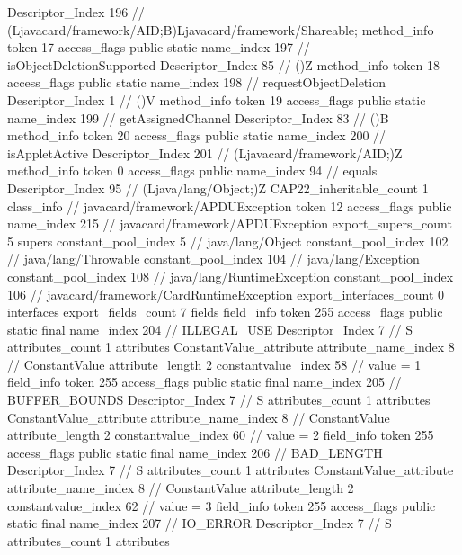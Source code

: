 {{{{{					Descriptor_Index	196		// (Ljavacard/framework/AID;B)Ljavacard/framework/Shareable;
				}
				method_info {
					token	17
					access_flags	public static
					name_index	197		// isObjectDeletionSupported
					Descriptor_Index	85		// ()Z
				}
				method_info {
					token	18
					access_flags	public static
					name_index	198		// requestObjectDeletion
					Descriptor_Index	1		// ()V
				}
				method_info {
					token	19
					access_flags	public static
					name_index	199		// getAssignedChannel
					Descriptor_Index	83		// ()B
				}
				method_info {
					token	20
					access_flags	public static
					name_index	200		// isAppletActive
					Descriptor_Index	201		// (Ljavacard/framework/AID;)Z
				}
				method_info {
					token	0
					access_flags	public
					name_index	94		// equals
					Descriptor_Index	95		// (Ljava/lang/Object;)Z
				}
			}
			CAP22_inheritable_count	1
		}
		class_info {		// javacard/framework/APDUException
			token	12
			access_flags	public
			name_index	215		// javacard/framework/APDUException
			export_supers_count	5
			supers {
				constant_pool_index	5		// java/lang/Object
				constant_pool_index	102		// java/lang/Throwable
				constant_pool_index	104		// java/lang/Exception
				constant_pool_index	108		// java/lang/RuntimeException
				constant_pool_index	106		// javacard/framework/CardRuntimeException
			}
			export_interfaces_count	0
			interfaces {
			}
			export_fields_count	7
			fields {
			field_info {
				token	255
				access_flags	public static final
				name_index	204		// ILLEGAL_USE
				Descriptor_Index	7		// S
				attributes_count	1
				attributes {
				ConstantValue_attribute {
					attribute_name_index	8		// ConstantValue
					attribute_length	2
					constantvalue_index	58		// value = 1
				}
				}
			}
			field_info {
				token	255
				access_flags	public static final
				name_index	205		// BUFFER_BOUNDS
				Descriptor_Index	7		// S
				attributes_count	1
				attributes {
				ConstantValue_attribute {
					attribute_name_index	8		// ConstantValue
					attribute_length	2
					constantvalue_index	60		// value = 2
				}
				}
			}
			field_info {
				token	255
				access_flags	public static final
				name_index	206		// BAD_LENGTH
				Descriptor_Index	7		// S
				attributes_count	1
				attributes {
				ConstantValue_attribute {
					attribute_name_index	8		// ConstantValue
					attribute_length	2
					constantvalue_index	62		// value = 3
				}
				}
			}
			field_info {
				token	255
				access_flags	public static final
				name_index	207		// IO_ERROR
				Descriptor_Index	7		// S
				attributes_count	1
				attributes {
}}}}}}
